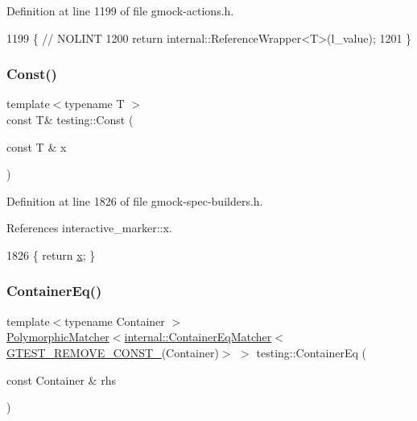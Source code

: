 Definition at line 1199 of file gmock-\/actions.\+h.


\begin{DoxyCode}
1199                                                      \{  \textcolor{comment}{// NOLINT}
1200   \textcolor{keywordflow}{return} internal::ReferenceWrapper<T>(l\_value);
1201 \}
\end{DoxyCode}
\mbox{\label{namespacetesting_a945ac56c5508a3c9c032bbe8aae8dcfa}} 
\subsubsection{\texorpdfstring{Const()}{Const()}}
{\footnotesize\ttfamily template$<$typename T $>$ \\
const T\& testing\+::\+Const (\begin{DoxyParamCaption}\item[{const T \&}]{x }\end{DoxyParamCaption})\hspace{0.3cm}{\ttfamily [inline]}}



Definition at line 1826 of file gmock-\/spec-\/builders.\+h.



References interactive\+\_\+marker\+::x.


\begin{DoxyCode}
1826 \{ \textcolor{keywordflow}{return} \hyperlink{namespaceinteractive__marker_acda52804aef30b460a72fb21ee01d69d}{x}; \}
\end{DoxyCode}
\mbox{\label{namespacetesting_a5928ffc4e976a4da981512c422792840}} 
\subsubsection{\texorpdfstring{Container\+Eq()}{ContainerEq()}}
{\footnotesize\ttfamily template$<$typename Container $>$ \\
\hyperlink{classtesting_1_1PolymorphicMatcher}{Polymorphic\+Matcher}$<$\hyperlink{classtesting_1_1internal_1_1ContainerEqMatcher}{internal\+::\+Container\+Eq\+Matcher}$<$ \hyperlink{gtest-internal_8h_a2ffec8c60510eb130af387f5ce9a756a}{G\+T\+E\+S\+T\+\_\+\+R\+E\+M\+O\+V\+E\+\_\+\+C\+O\+N\+S\+T\+\_\+}(Container)$>$ $>$ testing\+::\+Container\+Eq (\begin{DoxyParamCaption}\item[{const Container \&}]{rhs }\end{DoxyParamCaption})\hspace{0.3cm}{\ttfamily [inline]}}



